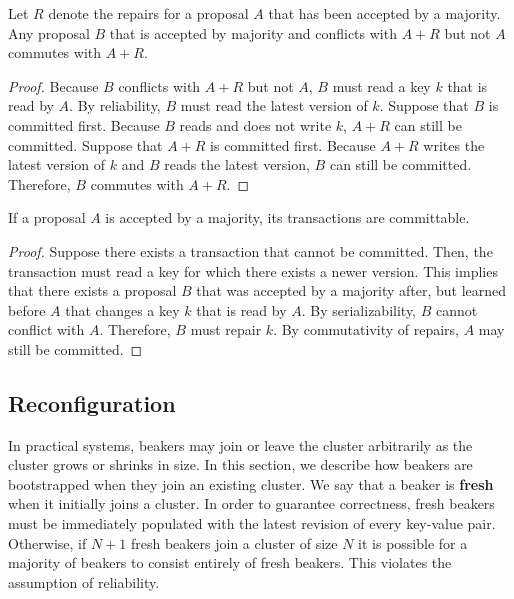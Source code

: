 \documentclass[../main.tex]{subfiles}
\begin{document}
  \begin{theorem}
    Let $R$ denote the repairs for a proposal $A$ that has been accepted by a majority. Any proposal
    $B$ that is accepted by majority and conflicts with $A + R$ but not $A$ commutes with $A + R$.
  \end{theorem}
  \begin{proof}
    Because $B$ conflicts with $A + R$ but not $A$, $B$ must read a key $k$ that is read by $A$.
    By reliability, $B$ must read the latest version of $k$. Suppose that $B$ is committed first.
    Because $B$ reads and does not write $k$, $A + R$ can still be committed. Suppose that
    $A + R$ is committed first. Because $A + R$ writes the latest version of $k$ and $B$ reads the
    latest version, $B$ can still be committed. Therefore, $B$ commutes with $A + R$.
  \end{proof}

  \begin{theorem}[Consistency]
    If a proposal $A$ is accepted by a majority, its transactions are committable.
  \end{theorem}
  \begin{proof}
    Suppose there exists a transaction that cannot be committed. Then, the transaction must read a
    key for which there exists a newer version. This implies that there exists a proposal $B$ that
    was accepted by a majority after, but learned before $A$ that changes a key $k$ that is read
    by $A$. By serializability, $B$ cannot conflict with $A$. Therefore, $B$ must repair $k$. By
    commutativity of repairs, $A$ may still be committed.
  \end{proof}

  \subsection{Reconfiguration}
  In practical systems, beakers may join or leave the cluster arbitrarily as the cluster grows or
  shrinks in size. In this section, we describe how beakers are bootstrapped when they join an
  existing cluster. We say that a beaker is \textbf{fresh} when it initially joins a cluster. In
  order to guarantee correctness, fresh beakers must be immediately populated with the latest
  revision of every key-value pair. Otherwise, if $N + 1$ fresh beakers join a cluster of size $N$
  it is possible for a majority of beakers to consist entirely of fresh beakers. This violates the
  assumption of reliability.
\end{document}
